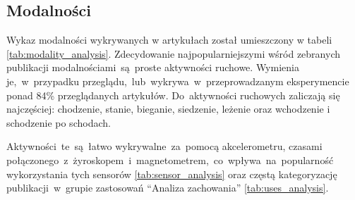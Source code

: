 \subsection{Modalności}
\label{base_modalities}
Wykaz modalności wykrywanych w artykułach został umieszczony w tabeli \ref{tab:modality_analysis}. Zdecydowanie najpopularniejszymi wśród zebranych publikacji modalnościami~są~proste aktywności ruchowe. Wymienia je,~w~przypadku przeglądu,~lub~wykrywa~w~przeprowadzanym eksperymencie ponad 84\% przeglądanych artykułów. Do~aktywności ruchowych zaliczają się najczęściej: chodzenie, stanie, bieganie, siedzenie, leżenie oraz wchodzenie i schodzenie po schodach.

Aktywności~te~są~łatwo wykrywalne~za~pomocą akcelerometru, czasami połączonego~z~żyroskopem~i~magnetometrem,~co~wpływa~na~popularność wykorzystania tych sensorów \ref{tab:sensor_analysis} oraz częstą kategoryzację publikacji~w~grupie zastosowań ``Analiza zachowania'' \ref{tab:uses_analysis}.


